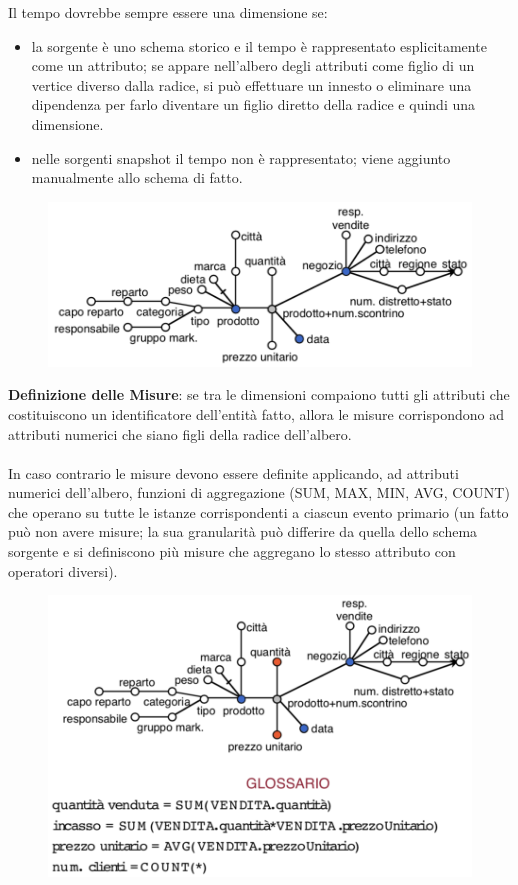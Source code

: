 \documentclass[a4paper, notitlepage, 9pt]{extreport}
\begin{document}
\begin{multicols}{2}
	\noindent
	Il tempo dovrebbe sempre essere una dimensione se:
	\begin{itemize}
		\item la sorgente è uno schema storico e il tempo è rappresentato esplicitamente come un attributo; se appare nell’albero degli attributi come figlio di un vertice diverso dalla radice, si può effettuare un innesto o eliminare una dipendenza per farlo diventare un figlio diretto della radice e quindi una dimensione.
		\item nelle sorgenti snapshot il tempo non è rappresentato; viene aggiunto manualmente allo schema di fatto.
	\end{itemize}
	\columnbreak
	\begin{figure}[H]
		\centering
		\includegraphics[scale=0.43]{Dimensioni}
	\end{figure}
\end{multicols}
\begin{multicols}{2}
	\noindent
	\textbf{Definizione delle Misure}: se tra le dimensioni compaiono tutti gli attributi che costituiscono un identificatore dell’entità fatto, allora le misure corrispondono ad attributi numerici che siano figli della radice dell’albero.\\\\
	In caso contrario le misure devono essere definite applicando, ad attributi numerici dell’albero, funzioni di aggregazione (SUM, MAX, MIN, AVG, COUNT) che operano su tutte le istanze corrispondenti a ciascun evento primario (un fatto può non avere misure; la sua granularità può differire da quella dello schema sorgente e si definiscono più misure che aggregano lo stesso attributo con operatori diversi).
	\columnbreak
	\begin{figure}[H]
		\centering
		\includegraphics[scale=0.38]{Misure}
	\end{figure}
\end{multicols}
\end{document}
